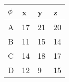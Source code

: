 
  \begin{minipage}{0.48\textwidth}

    \begin{tabular}{|l|l|l|l|}
      \hline
      $\phi$ & x  & y  & z  \\ \hline
      A      & 17 & 21 & 20 \\ \hline
      B      & 11 & 15 & 14 \\ \hline
      C      & 14 & 18 & 17 \\ \hline
      D      & 12 & 9  & 15 \\ \hline
    \end{tabular}
  \end{minipage}
